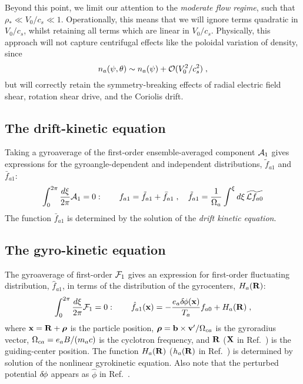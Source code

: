 Beyond this point, we limit our attention to the {\it moderate 
flow regime}, such that $\rho_* \ll V_0/c_s \ll 1$.  Operationally, 
this means that we will ignore terms quadratic in $V_0/c_s$, whilst 
retaining all terms which are linear in $V_0/c_s$.  Physically, this 
approach will not capture centrifugal effects like the poloidal 
variation of density, since
%
\begin{equation}
n_a(\psi,\theta) \sim n_a(\psi) + {\cal O}(V_0^2/c_s^2) \; ,
\end{equation}
%
but will correctly retain the symmetry-breaking effects of radial
electric field shear, rotation shear drive, and the Coriolis drift.
%
\subsection{The drift-kinetic equation}

Taking a gyroaverage of the first-order ensemble-averaged component 
${\cal A}_1$ gives expressions for the gyroangle-dependent and 
independent distributions, ${\tilde f}_{a1}$ and ${\bar f}_{a1}$:
%
\begin{equation}
\int_0^{2\pi} \frac{d\xi}{2\pi} {\cal A}_1 = 0 : \qquad 
 f_{a1} = {\tilde f}_{a1} + {\bar f}_{a1} \; , \quad 
{\tilde f}_{a1} = \frac{1}{\Omega_a} \int^\xi d\xi \, \widetilde{{\cal L} f_{a0}}
\end{equation}
%
The function ${\bar f}_{a1}$ is determined by the solution of 
the {\it drift kinetic equation}.  

\subsection{The gyro-kinetic equation}

The gyroaverage of first-order ${\cal F}_1$ gives an expression for 
first-order fluctuating distribution, ${\hat f}_{a1}$, in terms of the 
distribution of the gyrocenters, $H_a({\bf R})$:
%
\begin{equation}
\int_0^{2\pi} \frac{d\xi}{2\pi} {\cal F}_1 = 0 : \qquad  
{\hat f}_{a1}({\bf x}) = -\frac{e_a {\delta \hskip -1pt \phi}({\bf x})}{T_a} f_{a0} + 
H_a(\mathbf{R}) \; ,
\end{equation}
%
where $\mathbf{x} =\mathbf{R}+\boldsymbol{\rho}$ is the particle position, $\boldsymbol{\rho} = \mathbf{b}\times\mathbf{v}^\prime/\Omega_{ca}$ 
is the gyroradius vector, $\Omega_{ca} = e_a B/(m_a c)$ is the cyclotron frequency, 
and $\mathbf{R}$ (${\bf X}$ in Ref.~\cite{sugama:1998}) is the guiding-center 
position.  The function $H_a(\mathbf{R})$ ($h_a(\mathbf{R})$ in Ref.~\cite{sugama:1998}) 
is determined by solution of the nonlinear gyrokinetic equation.  Also 
note that the perturbed potential $\delta \hskip -1pt \phi$ appears as ${\hat \phi}$ in 
Ref.~\cite{sugama:1998}.

